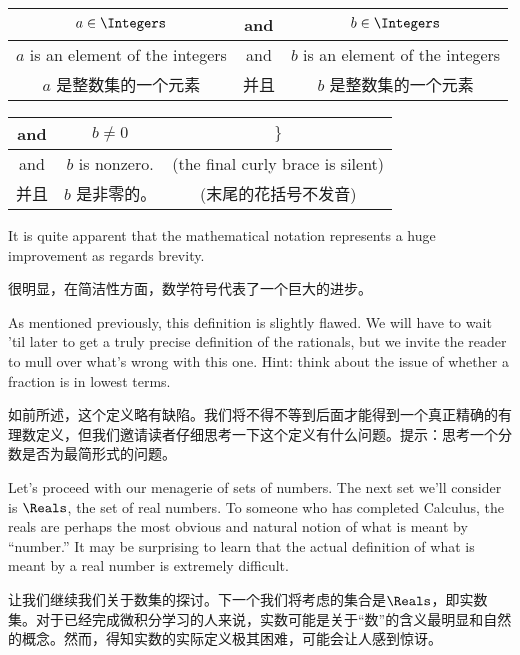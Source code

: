 \vspace{.2in}

\begin{tabular}{c|c|c}
\rule[-10pt]{0pt}{22pt} $a \in \Integers$ & and & $b \in \Integers$ \\ \hline
\rule[-6pt]{0pt}{22pt} $a$ is an element of the integers & and & $b$ is an
element of the integers \\
\rule[-6pt]{0pt}{22pt} $a$ 是整数集的一个元素 & 并且 & $b$ 是整数集的一个元素 \\
\end{tabular}

\vspace{.2in}

\begin{tabular}{c|c|c}
\rule[-10pt]{0pt}{22pt} and & $b \neq 0$ & $\}$ \\ \hline
\rule[-6pt]{0pt}{22pt} and & $b$ is nonzero. & (the final curly brace
is silent) \\
\rule[-6pt]{0pt}{22pt} 并且 & $b$ 是非零的。 & (末尾的花括号不发音) \\
\end{tabular}

\vspace{.2in}

It is quite apparent that the mathematical notation represents a huge
improvement as regards brevity.

很明显，在简洁性方面，数学符号代表了一个巨大的进步。

As mentioned previously, this definition is slightly flawed.  We will
have to wait 'til later to get a truly precise
definition of the rationals, but we invite the reader to mull over
what's wrong with this one. Hint: think about the issue of whether
a fraction is in lowest terms.

如前所述，这个定义略有缺陷。我们将不得不等到后面才能得到一个真正精确的有理数定义，但我们邀请读者仔细思考一下这个定义有什么问题。提示：思考一个分数是否为最简形式的问题。

Let's proceed with our menagerie of sets of numbers.  The next set
we'll consider is $\Reals$, the set of real numbers. To someone
who has completed Calculus, the reals are perhaps the most obvious and
natural notion of what is meant by ``number.''  It may be surprising to
learn that the actual definition of what is meant by a real number is
extremely difficult.

让我们继续我们关于数集的探讨。下一个我们将考虑的集合是$\Reals$，即实数集。对于已经完成微积分学习的人来说，实数可能是关于“数”的含义最明显和自然的概念。然而，得知实数的实际定义极其困难，可能会让人感到惊讶。

